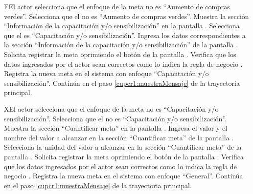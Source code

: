 \begin{UCtrayectoriaA}{E}{El actor selecciona que el enfoque de la meta no es ``Aumento de compras verdes''.}
	\UCpaso[\UCactor] Selecciona que el  no es ``Aumento de compras verdes''. 
	\UCpaso[\UCsist] Muestra la sección ``Información de la capacitación y/o sensibilización'' en la pantalla .
	\UCpaso[\UCactor] Selecciona que el  es ``Capacitación y/o sensibilización''. 
	\UCpaso[\UCactor] Ingresa los datos correspondientes a la sección ``Información de la capacitación y/o sensibilización'' de la pantalla .
	\UCpaso[\UCactor] Solicita registrar la meta oprimiendo el botón  de la pantalla .  
	\UCpaso[\UCsist] Verifica que los datos ingresados por el actor sean correctos como lo indica la regla de negocio .   
	\UCpaso[\UCsist] Registra la nueva meta en el sistema con enfoque ``Capacitación y/o sensibilización''.
	\UCpaso[] Continúa en el paso \ref{cupcr1:muestraMensaje} de la trayectoria principal.
\end{UCtrayectoriaA}

\begin{UCtrayectoriaA}{X}{El actor selecciona que el enfoque de la meta no es ``Capacitación y/o sensibilización''.}
	\UCpaso[\UCactor] Selecciona que el  no es ``Capacitación y/o sensibilización''. 
	\UCpaso[\UCsist] Muestra la sección ``Cuantificar meta'' en la pantalla .
	\UCpaso[\UCactor] Ingresa el valor y el nombre del valor a alcanzar en la sección ``Cuantificar meta'' de la pantalla .
	\UCpaso[\UCactor] Selecciona la unidad del valor a alcanzar en la sección ``Cuantificar meta'' de la pantalla . 
	\UCpaso[\UCactor] Solicita registrar la meta oprimiendo el botón  de la pantalla .  
	\UCpaso[\UCsist] Verifica que los datos ingresados por el actor sean correctos como lo indica la regla de negocio .   
	\UCpaso[\UCsist] Registra la nueva meta en el sistema con enfoque ``General''.
	\UCpaso[] Continúa en el paso \ref{cupcr1:muestraMensaje} de la trayectoria principal.
\end{UCtrayectoriaA}


